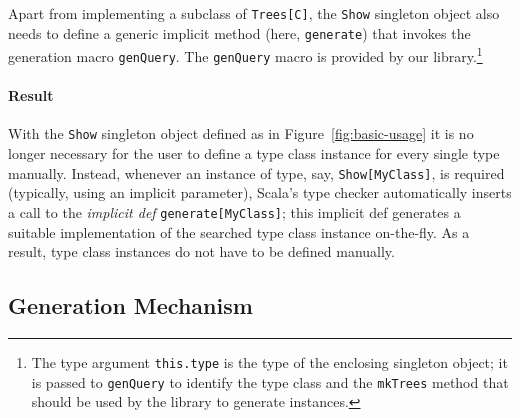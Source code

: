 \documentclass[preprint,nocopyrightspace]{sigplanconf}
\newcommand{\gap}{\quad\quad}
\newcommand{\ba}{\begin{array}}
\newcommand{\ea}{\end{array}}
\begin{document}
Apart from implementing a subclass of \verb|Trees[C]|, the \verb|Show|
singleton object also needs to define a generic implicit method (here,
\verb|generate|) that invokes the generation macro \verb|genQuery|. The
\verb|genQuery| macro is provided by our library.\footnote{The type argument
\texttt{this.type} is the type of the enclosing singleton object; it is passed
to \texttt{genQuery} to identify the type class and the \texttt{mkTrees}
method that should be used by the library to generate instances.}

\paragraph{Result} With the \verb|Show| singleton object defined as in Figure~\ref{fig:basic-usage}
it is no longer necessary for the user to define a type class instance for every single type manually.
Instead, whenever an instance of type, say, \verb|Show[MyClass]|, is required
(typically, using an implicit parameter), Scala's type checker automatically inserts
a call to the \emph{implicit def} \verb|generate[MyClass]|; this implicit def generates a
suitable implementation of the searched type class instance on-the-fly. As a result,
type class instances do not have to be defined manually.

\subsection{Generation Mechanism}\label{sec:basic-generation}



\end{document}
